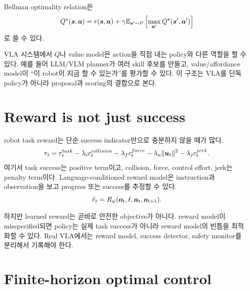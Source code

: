 Bellman optimality relation은
\begin{equation}
  Q^{\star}(\bm{s},\bm{a})
  =
  r(\bm{s},\bm{a})
  +
  \gamma
  \mathbb{E}_{\bm{s}'\sim P}
  \left[
  \max_{\bm{a}'}Q^{\star}(\bm{s}',\bm{a}')
  \right]
  \label{eq:bellman-optimality}
\end{equation}
로 쓸 수 있다.

VLA 시스템에서 $Q$나 value model은 action을 직접 내는 policy와 다른 역할을 할 수 있다. 예를 들어 LLM/VLM planner가 여러 skill 후보를 만들고, value/affordance model이 ``이 robot이 지금 할 수 있는가''를 평가할 수 있다. 이 구조는 VLA를 단독 policy가 아니라 proposal과 scoring의 결합으로 본다.

\section{Reward is not just success}

robot task reward는 단순 success indicator만으로 충분하지 않을 때가 많다.
\begin{equation}
  r_t
  =
  r^{task}_t
  -
  \lambda_c c^{collision}_t
  -
  \lambda_f c^{force}_t
  -
  \lambda_u \|\bm{u}_t\|^2
  -
  \lambda_j c^{jerk}_t.
  \label{eq:robot-reward}
\end{equation}
여기서 task success는 positive term이고, collision, force, control effort, jerk는 penalty term이다. Language-conditioned reward model은 instruction과 observation을 보고 progress 또는 success를 추정할 수 있다.
\begin{equation}
  \hat{r}_t
  =
  R_{\psi}(\bm{o}_t,\ell,\bm{a}_t,\bm{o}_{t+1}).
  \label{eq:learned-reward}
\end{equation}

하지만 learned reward는 곧바로 안전한 objective가 아니다. reward model이 misspecified되면 policy는 실제 task success가 아니라 reward model의 빈틈을 최적화할 수 있다. Real VLA에서는 reward model, success detector, safety monitor를 분리해서 기록해야 한다.

\section{Finite-horizon optimal control}

